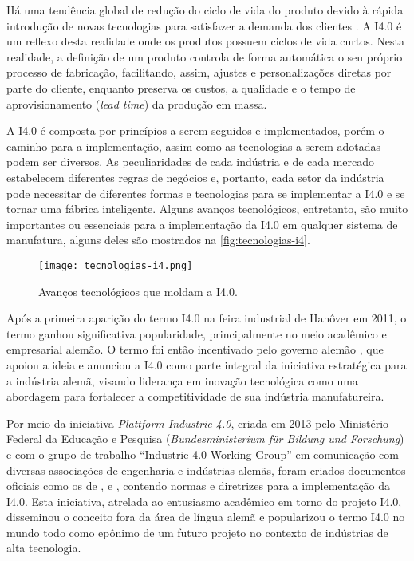 Há uma tendência global de redução do ciclo de vida do produto devido à rápida introdução de novas tecnologias para satisfazer a demanda dos clientes \cite{trappey2008lifecycle}. A I4.0 é um reflexo desta realidade onde os produtos possuem ciclos de vida curtos. Nesta realidade, a definição de um produto controla de forma automática o seu próprio processo de fabricação, facilitando, assim, ajustes e personalizações diretas por parte do cliente, enquanto preserva os custos, a qualidade e o tempo de aprovisionamento (\textit{lead time}) da produção em massa.

A I4.0 é composta por princípios a serem seguidos e implementados, porém o caminho para a implementação, assim como as tecnologias a serem adotadas podem ser diversos. As peculiaridades de cada indústria e de cada mercado estabelecem diferentes regras de negócios e, portanto, cada setor da indústria pode necessitar de diferentes formas e tecnologias para se implementar a I4.0 e se tornar uma fábrica inteligente. Alguns avanços tecnológicos, entretanto, são muito importantes ou essenciais para a implementação da I4.0 em qualquer sistema de manufatura, alguns deles são mostrados na \autoref{fig:tecnologias-i4}.

\begin{figure}[htb]
	\centering
	\texttt{[image: tecnologias-i4.png]}
	\caption{Avanços tecnológicos que moldam a I4.0.}
	\label{fig:tecnologias-i4}
\end{figure}

Após a primeira aparição do termo I4.0 na feira industrial de Hanôver em 2011, o termo ganhou significativa popularidade, principalmente no meio acadêmico e empresarial alemão. O termo foi então incentivado pelo governo alemão \cite{lasi2014industryfour, kagermann2013recommendations}, que apoiou a ideia e anunciou a I4.0 como parte integral da iniciativa estratégica para a indústria alemã, visando liderança em inovação tecnológica \cite{drath2014industrie} como uma abordagem para fortalecer a competitividade de sua indústria manufatureira.

Por meio da iniciativa \textit{Plattform Industrie 4.0}, criada em 2013 pelo Ministério Federal da Educação e Pesquisa (\textit{Bundesministerium für Bildung und Forschung}) \cite{hartmut2019plattform} e com o grupo de trabalho ``Industrie 4.0 Working Group'' em comunicação com diversas associações de engenharia e indústrias alemãs, foram criados documentos oficiais como os de ,  e , contendo normas e diretrizes para a implementação da I4.0. Esta iniciativa, atrelada ao entusiasmo acadêmico em torno do projeto I4.0, disseminou o conceito fora da área de língua alemã e popularizou o termo I4.0 no mundo todo como epônimo de um futuro projeto no contexto de indústrias de alta tecnologia.

